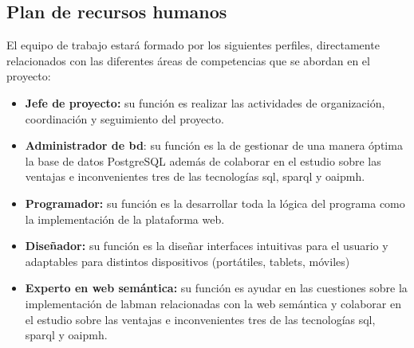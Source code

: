 \subsection{Plan de recursos humanos}\label{sec:planRecursosHumanos}

El equipo de trabajo estará formado por los siguientes perfiles, directamente relacionados con las diferentes áreas de competencias que se abordan en el proyecto: 

\begin{itemize}
	\item \textbf{Jefe de proyecto:} su función es realizar las actividades de organización, coordinación y seguimiento del proyecto.
	\item \textbf{Administrador de \acrlong{bd}}: su función es la de gestionar de una manera óptima la base de datos PostgreSQL además de colaborar en el estudio sobre las ventajas e inconvenientes tres de las tecnologías \acrshort{sql}, \acrshort{sparql} y \acrshort{oaipmh}. 
	\item \textbf{Programador:} su función es la desarrollar toda la lógica del programa como la implementación de la plataforma web. 
	\item \textbf{Diseñador:} su función es la diseñar interfaces intuitivas para el usuario y adaptables para distintos dispositivos (portátiles, tablets, móviles) 
	\item \textbf{Experto en web semántica:} su función es ayudar en las cuestiones sobre la implementación de \acrshort{labman} relacionadas con la web semántica y colaborar en el estudio sobre las ventajas e inconvenientes tres de las tecnologías \acrshort{sql}, \acrshort{sparql} y \acrshort{oaipmh}.
\end{itemize}